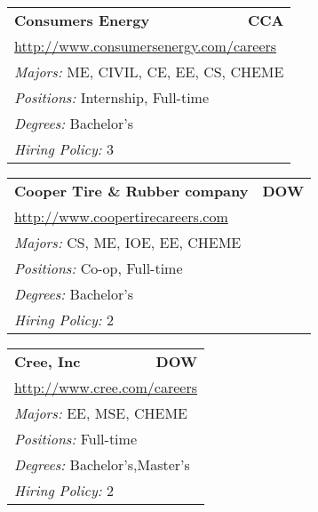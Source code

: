 \documentclass[twoside]{article}
\begin{document}
\begin{center}
\begin{multicols}{3}
\begin{FlushLeft}
\begin{minipage}{\columnwidth}
\end{minipage}
 
\begin{minipage}{\columnwidth}\begin{tabularx}{.95\columnwidth}{Xr}
                 {\Large\bf Consumers Energy} & {\Large\bf CCA}\\
    \multicolumn{2}{p{.95\columnwidth}}{\url{http://www.consumersenergy.com/careers}}\\
    \multicolumn{2}{p{.95\columnwidth}}{\emph{Majors:} ME, CIVIL, CE, EE, CS, CHEME}\\
    \multicolumn{2}{p{.95\columnwidth}}{\emph{Positions:} Internship, Full-time}\\
    \multicolumn{2}{p{.95\columnwidth}}{\emph{Degrees:} Bachelor's}\\
    \multicolumn{2}{p{.95\columnwidth}}{\emph{Hiring Policy:} 3}\\
    \end{tabularx}
    
\end{minipage}
 
\begin{minipage}{\columnwidth}\begin{tabularx}{.95\columnwidth}{Xr}
                 {\Large\bf Cooper Tire \& Rubber company} & {\Large\bf DOW}\\
    \multicolumn{2}{p{.95\columnwidth}}{\url{http://www.coopertirecareers.com}}\\
    \multicolumn{2}{p{.95\columnwidth}}{\emph{Majors:} CS, ME, IOE, EE, CHEME}\\
    \multicolumn{2}{p{.95\columnwidth}}{\emph{Positions:} Co-op, Full-time}\\
    \multicolumn{2}{p{.95\columnwidth}}{\emph{Degrees:} Bachelor's}\\
    \multicolumn{2}{p{.95\columnwidth}}{\emph{Hiring Policy:} 2}\\
    \end{tabularx}
    
\end{minipage}
 
\begin{minipage}{\columnwidth}\begin{tabularx}{.95\columnwidth}{Xr}
                 {\Large\bf Cree, Inc} & {\Large\bf DOW}\\
    \multicolumn{2}{p{.95\columnwidth}}{\url{http://www.cree.com/careers}}\\
    \multicolumn{2}{p{.95\columnwidth}}{\emph{Majors:} EE, MSE, CHEME}\\
    \multicolumn{2}{p{.95\columnwidth}}{\emph{Positions:} Full-time}\\
    \multicolumn{2}{p{.95\columnwidth}}{\emph{Degrees:} Bachelor's,Master's}\\
    \multicolumn{2}{p{.95\columnwidth}}{\emph{Hiring Policy:} 2}\\
    \end{tabularx}
    

\end{minipage}
\end{FlushLeft}
\end{multicols}
\end{center}
\end{document}
